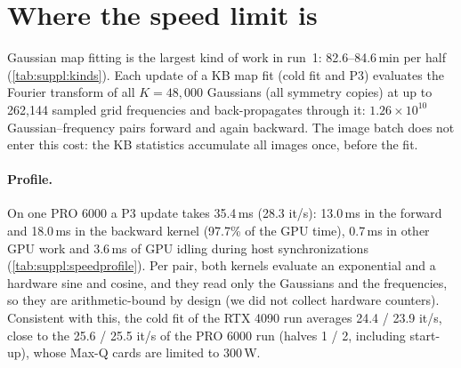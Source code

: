 \section{Where the speed limit is}
\label{sec:suppl:speed}

Gaussian map fitting is the largest kind of work in run~1: 82.6--84.6\,min per half (\cref{tab:suppl:kinds}).
Each update of a KB map fit (cold fit and P3) evaluates the Fourier transform of all $K=48{,}000$ Gaussians (all symmetry copies) at up to 262{,}144 sampled grid frequencies and back-propagates through it:
$1.26\times10^{10}$ Gaussian--frequency pairs forward and again backward.
The image batch does not enter this cost: the KB statistics accumulate all images once, before the fit.

\paragraph{Profile.}
On one PRO 6000 a P3 update takes 35.4\,ms (28.3 it/s): 13.0\,ms in the forward and 18.0\,ms in the backward kernel (97.7\% of the GPU time), 0.7\,ms in other GPU work and 3.6\,ms of GPU idling during host synchronizations (\cref{tab:suppl:speedprofile}).
Per pair, both kernels evaluate an exponential and a hardware sine and cosine, and they read only the Gaussians and the frequencies, so they are arithmetic-bound by design (we did not collect hardware counters).
Consistent with this, the cold fit of the RTX 4090 run averages 24.4 / 23.9 it/s, close to the 25.6 / 25.5 it/s of the PRO 6000 run (halves 1 / 2, including start-up), whose Max-Q cards are limited to 300\,W.

